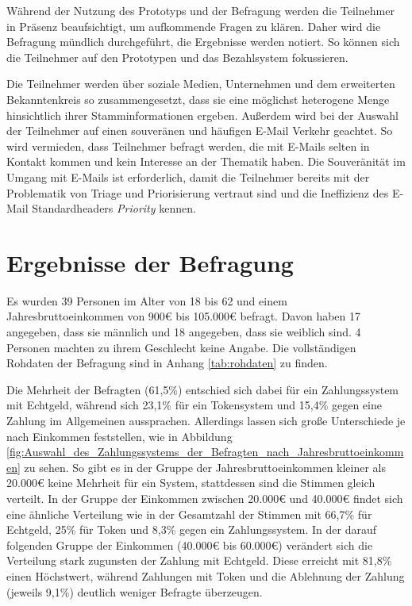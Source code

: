 Während der Nutzung des Prototyps und der Befragung werden die Teilnehmer in Präsenz beaufsichtigt, um aufkommende Fragen zu klären. Daher wird die Befragung mündlich durchgeführt, die Ergebnisse werden notiert. So können sich die Teilnehmer auf den Prototypen und das Bezahlsystem fokussieren.

Die Teilnehmer werden über soziale Medien, Unternehmen und dem erweiterten Bekanntenkreis so zusammengesetzt, dass sie eine möglichst heterogene Menge hinsichtlich ihrer Stamminformationen ergeben. Außerdem wird bei der Auswahl der Teilnehmer auf einen souveränen und häufigen E-Mail Verkehr geachtet. So wird vermieden, dass Teilnehmer befragt werden, die mit E-Mails selten in Kontakt kommen und kein Interesse an der Thematik haben. Die Souveränität im Umgang mit E-Mails ist erforderlich, damit die Teilnehmer bereits mit der Problematik von Triage und Priorisierung vertraut sind und die Ineffizienz des E-Mail Standardheaders \textit{Priority} kennen.

\section{Ergebnisse der Befragung}
\label{Ergebnisse_der_Befragung}
Es wurden 39 Personen im Alter von 18 bis 62 und einem Jahresbruttoeinkommen von 900€ bis 105.000€ befragt. Davon haben 17 angegeben, dass sie männlich und 18 angegeben, dass sie weiblich sind. 4 Personen machten zu ihrem Geschlecht keine Angabe. Die vollständigen Rohdaten der Befragung sind in Anhang \ref{tab:rohdaten} zu finden.

Die Mehrheit der Befragten (61,5\%) entschied sich dabei für ein Zahlungssystem mit Echtgeld, während sich 23,1\% für ein Tokensystem und 15,4\% gegen eine Zahlung im Allgemeinen aussprachen. Allerdings lassen sich große Unterschiede je nach Einkommen feststellen, wie in Abbildung \ref{fig:Auswahl_des_Zahlungssystems_der_Befragten_nach_Jahresbruttoeinkommen} zu sehen. So gibt es in der Gruppe der Jahresbruttoeinkommen kleiner als 20.000€ keine Mehrheit für ein System, stattdessen sind die Stimmen gleich verteilt. In der Gruppe der Einkommen zwischen 20.000€ und 40.000€ findet sich eine ähnliche Verteilung wie in der Gesamtzahl der Stimmen mit 66,7\% für Echtgeld, 25\% für Token und 8,3\% gegen ein Zahlungssystem. In der darauf folgenden Gruppe der Einkommen (40.000€ bis 60.000€) verändert sich die Verteilung stark zugunsten der Zahlung mit Echtgeld. Diese erreicht mit 81,8\% einen Höchstwert, während Zahlungen mit Token und die Ablehnung der Zahlung (jeweils 9,1\%) deutlich weniger Befragte überzeugen.

